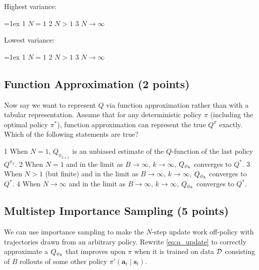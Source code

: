 \def\highest{3} %
\def\lowest{1} %
\ifsolutions\solve\thesubsection\fi
\begin{minipage}{0.49\linewidth}
Highest variance:\smallskip
\begin{itemize}\itemsep=1ex
    \checkeditem\highest1 $N = 1$
    \checkeditem\highest2 $N > 1$
    \checkeditem\highest3 $N \to \infty$
\end{itemize}
\end{minipage}
\begin{minipage}{0.49\linewidth}
Lowest variance:\smallskip
\begin{itemize}\itemsep=1ex
    \checkeditem\lowest1 $N = 1$
    \checkeditem\lowest2 $N > 1$
    \checkeditem\lowest3 $N \to \infty$
\end{itemize}
\end{minipage}

\subsection{Function Approximation (2 points)}
\label{q:function_approximation}
Now say we want to represent $Q$ via function approximation rather than with a tabular representation. Assume that for any deterministic policy $\pi$ (including the optimal policy $\pi^*$), function approximation can represent the true $Q^\pi$ exactly.
Which of the following statements are true?

\def\answer{24} %
\ifsolutions\solve\thesubsection\fi
\begin{itemize}
    \checkeditem\answer1 When $N = 1$, $Q_{\phi_{k+1}}$ is an unbiased estimate of the $Q$-function of the last policy $Q^{\pi_k}$.
    \checkeditem\answer2 When $N = 1$ and in the limit as $B\to\infty,\,k \to \infty$, $Q_{\phi_k}$ converges to $Q^*$.
    \checkeditem\answer3 When $N > 1$ (but finite) and in the limit as $B\to\infty,\,k \to \infty$, $Q_{\phi_k}$ converges to $Q^*$.
    \checkeditem\answer4 When $N \to \infty$ and in the limit as $B \to \infty,\,k \to \infty$, $Q_{\phi_k}$ converges to $Q^*$.
\end{itemize}

\subsection{Multistep Importance Sampling (5 points)}
\label{q:importance_sampling}

We can use importance sampling to make the $N$-step update work off-policy with trajectories drawn from an arbitrary policy. Rewrite \eqref{eq:q_update} to correctly approximate a $Q_{\phi_k}$ that improves upon $\pi$ when it is trained on data $\mathcal{D}$ consisting of $B$ rollouts of some other policy $\pi'(\mathbf a_t\mid\mathbf s_t)$. 

